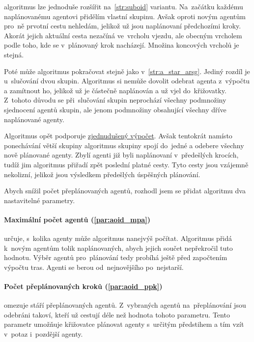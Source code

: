  algoritmus lze jednoduše rozšířit na~\ref{str:suboid} variantu.
Na~začátku každému naplánovanému agentovi přidělím vlastní skupinu.
Avšak oproti novým agentům pro~ně prvotní cestu nehledám, jelikož už jsou naplánovaní předchozími kroky.
Akorát jejich aktuální cesta nezačíná ve~vrcholu vjezdu,
ale obecným vrcholem podle toho, kde se v~plánovaný krok nacházejí.
Množina koncových vrcholů je stejná.

Poté může algoritmus pokračovat stejně jako v~\ref{str:a_star_arsg}.
Jediný rozdíl je u~slučování dvou skupin.
Algoritmus si nemůže dovolit odebrat agenta z~výpočtu a zamítnout ho,
jelikož už je částečně naplánován a už vjel do~křižovatky.
Z~tohoto důvodu se při~slučování skupin neprochází všechny podmnožiny sjednocení agentů skupin,
ale jenom podmnožiny obsahující všechny dříve naplánované agenty.

Algoritmus opět podporuje \hyperref[par:arsg_zvp]{zjednudušený výpočet}.
Avšak tentokrát namísto ponechávání větší skupiny
algoritmus skupiny spojí do~jedné a odebere všechny nově plánované agenty.
Zbylí agenti již byli naplánovaní v~předešlých krocích, tudíž jim algoritmus přiřadí zpět poslední platné cesty.
Tyto cesty jsou vzájemně nekolizní, jelikož jsou výsledkem předešlých úspěšných plánování.

Abych snížil počet přeplánovaných agentů, rozhodl jsem se přidat algoritmu dva nastavitelné parametry.

\paragraph{Maximální počet agentů (\ref{par:aoid_mpa})} určuje,
s~kolika agenty může algoritmus nanejvýš počítat.
Algoritmus přidá k~novým agentům tolik naplánovaných, abych jejich součet nepřekročil tuto hodnotu.
Výběr agentů pro~plánování tedy probíhá ještě před započtením výpočtu tras.
Agenti se berou od~nejnovějšího po~nejstarší.

\paragraph{Počet přeplánovaných kroků (\ref{par:aoid_ppk})}
omezuje stáří přeplánovaných agentů.
Z~vybraných agentů na~přeplánování jsou odebráni takoví, kteří už cestují déle než hodnota tohoto parametru.
Tento parametr umožňuje křižovatce plánovat agenty s~určitým předstihem a tím vzít v~potaz i~pozdější agenty.
